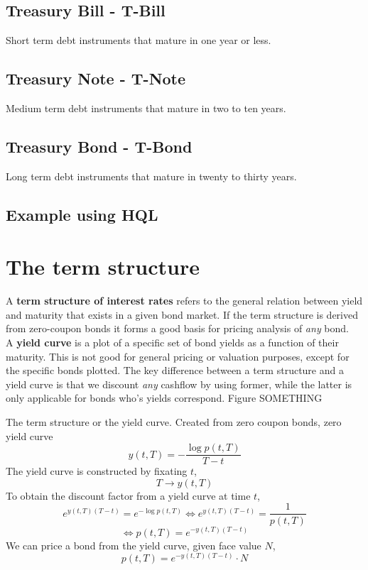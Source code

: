 \documentclass[11pt,a4paper]{article}
\numberwithin{equation}{section}
\begin{document}
\subsection{Treasury Bill - T-Bill}
Short term debt instruments that mature in one year or less.
\subsection{Treasury Note - T-Note}
Medium term debt instruments that mature in two to ten years.
\subsection{Treasury Bond - T-Bond}
Long term debt instruments that mature in twenty to thirty years.

\subsection{Example using HQL}

\section{The term structure}

A \textbf{term structure of interest rates} refers to the general relation between yield and maturity that exists in a given bond market. If the term structure is derived from zero-coupon bonds it forms a good basis for pricing analysis of \emph{any} bond.\\

A \textbf{yield curve} is a plot of a specific set of bond yields as a function of their maturity. This is not good for general pricing or valuation purposes, except for the specific bonds plotted. The key difference between a term structure and a yield curve is that we discount \emph{any} cashflow by using former, while the latter is only applicable for bonds who's yields correspond. Figure SOMETHING 

The term structure or the yield curve.
Created from zero coupon bonds, zero yield curve
\[
y(t,T)=-\frac{\log{p(t,T)}}{T-t}
\]
The yield curve is constructed by fixating $t$,
\[
T\to y(t,T)
\]
To obtain the discount factor from a yield curve at time $t$,
\[
e^{y(t,T)(T-t)}=e^{-\log{p(t,T)}}\iff e^{y(t,T)(T-t)}=\frac{1}{p(t,T)}
\]
\[
\iff p(t,T)=e^{-y(t,T)(T-t)}
\]
We can price a bond from the yield curve, given face value $N$,
\[
p(t,T)=e^{-y(t,T)(T-t)}\cdot N
\]
\end{document}
